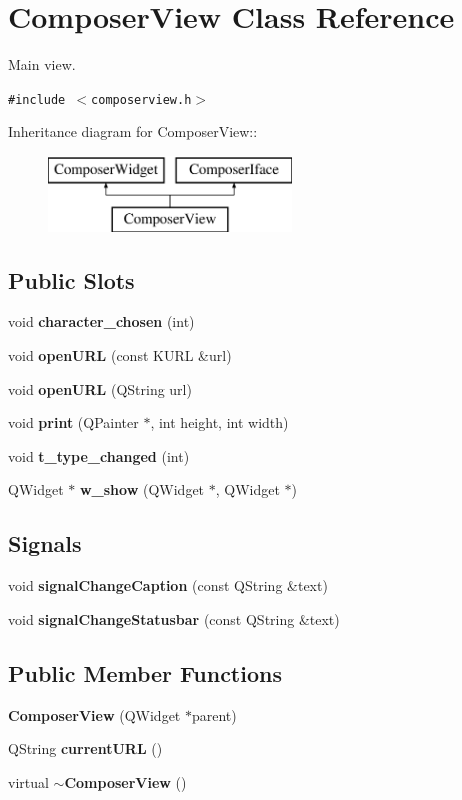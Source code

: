 \section{Composer\-View Class Reference}
\label{classComposerView}
Main view.  


{\tt \#include $<$composerview.h$>$}

Inheritance diagram for Composer\-View::\begin{figure}[H]
\begin{center}
\leavevmode
\includegraphics[height=2cm]{classComposerView}
\end{center}
\end{figure}
\subsection*{Public Slots}
\begin{CompactItemize}
\item 
void {\bf character\_\-chosen} (int)
\item 
void {\bf open\-URL} (const KURL \&url)
\item 
void {\bf open\-URL} (QString url)
\item 
void {\bf print} (QPainter $\ast$, int height, int width)
\item 
void {\bf t\_\-type\_\-changed} (int)
\item 
QWidget $\ast$ {\bf w\_\-show} (QWidget $\ast$, QWidget $\ast$)
\end{CompactItemize}
\subsection*{Signals}
\begin{CompactItemize}
\item 
void {\bf signal\-Change\-Caption} (const QString \&text)
\item 
void {\bf signal\-Change\-Statusbar} (const QString \&text)
\end{CompactItemize}
\subsection*{Public Member Functions}
\begin{CompactItemize}
\item 
{\bf Composer\-View} (QWidget $\ast$parent)
\item 
QString {\bf current\-URL} ()
\item 
virtual {\bf $\sim$Composer\-View} ()
\end{CompactItemize}
